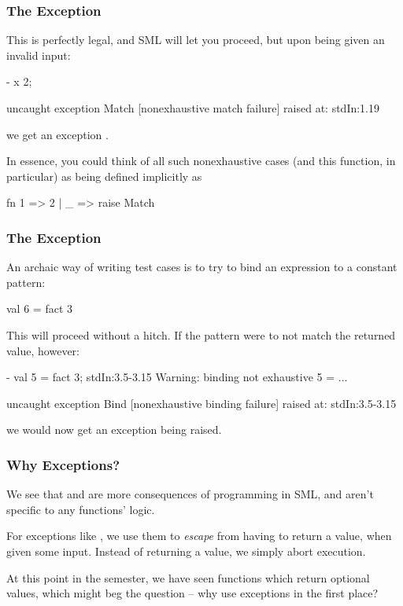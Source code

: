 \documentclass[aspectratio=169]{beamer}
\begin{document}
\begin{frame}[fragile]
  \frametitle{The  Exception}

  This is perfectly legal, and SML will let you proceed, but upon being given
  an invalid input:
  \begin{codeblock}
    - x 2;

    uncaught exception Match [nonexhaustive match failure]
      raised at: stdIn:1.19
  \end{codeblock}
  we get an exception .

  \vspace{\fill}

  In essence, you could think of all such nonexhaustive cases (and this function,
  in particular) as being defined implicitly as
  \begin{codeblock}
    fn 1 => 2 | _ => raise Match
  \end{codeblock}
\end{frame}

\begin{frame}[fragile]
  \frametitle{The  Exception}

  An archaic way of writing test cases is to try to bind an expression to a
  constant pattern:
  \begin{codeblock}
    val 6 = fact 3
  \end{codeblock}

  \vspace{\fill}

  This will proceed without a hitch. If the pattern were to not match the
  returned value, however:

  \begin{codeblock}
    - val 5 = fact 3;
    stdIn:3.5-3.15 Warning: binding not exhaustive
              5 = ...

    uncaught exception Bind [nonexhaustive binding failure]
      raised at: stdIn:3.5-3.15
  \end{codeblock}

  we would now get an exception  being raised.
\end{frame}

\begin{frame}[fragile]
  \frametitle{Why Exceptions?}

  We see that  and  are more consequences
  of programming in SML, and aren't specific to any functions' logic.

  \vspace{\fill}
  
  For exceptions like , we use them to \textit{escape} from
  having to return a value, when given some input. Instead of returning
  a value, we simply abort execution.

  \vspace{\fill}

  At this point in the semester, we have seen functions which return
  optional values, which might beg the question -- why use exceptions
  in the first place?
\end{frame}
\end{document}
